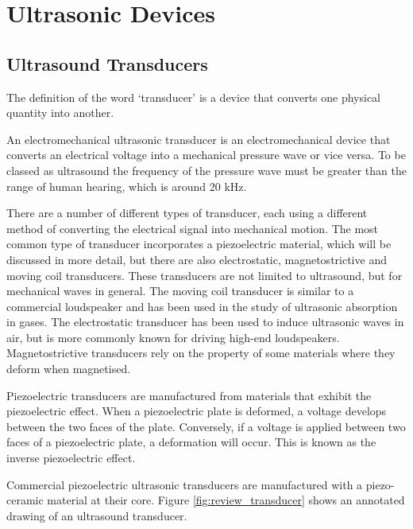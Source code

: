 \section{Ultrasonic Devices}

\subsection{Ultrasound Transducers}

The definition of the word `transducer' is a device that converts one physical quantity into another\cite{transducer_concise_2006}.

An electromechanical ultrasonic transducer is an electromechanical device that converts an electrical voltage into a mechanical pressure wave or vice versa. To be classed as ultrasound the frequency of the pressure wave must be greater than the range of human hearing, which is around 20 kHz\cite{rosen_signals_2010}.

There are a number of different types of transducer, each using a different method of converting the electrical signal into mechanical motion. The most common type of transducer incorporates a piezoelectric material, which will be discussed in more detail, but there are also electrostatic, magnetostrictive and moving coil transducers. These transducers are not limited to ultrasound, but for mechanical waves in general. The moving coil transducer is similar to a commercial loudspeaker and has been used in the study of ultrasonic absorption in gases\cite{st_clair_electromagnetic_1941}. The electrostatic transducer has been used to induce ultrasonic waves in air\cite{wright_studies_1994}, but is more commonly known for driving high-end loudspeakers\cite{heydt_acoustical_2000}. Magnetostrictive transducers rely on the property of some materials where they deform when magnetised\cite{ryu_magnetoelectric_2001}.

Piezoelectric transducers are manufactured from materials that exhibit the piezoelectric effect. When a piezoelectric plate is deformed, a voltage develops between the two faces of the plate. Conversely, if a voltage is applied between two faces of a piezoelectric plate, a deformation will occur. This is known as the inverse piezoelectric effect\cite{gooberman_ultrasonics:_1969,vives_piezoelectric_2013}.

Commercial piezoelectric ultrasonic transducers are manufactured with a piezo-ceramic material at their core. Figure \ref{fig:review_transducer} shows an annotated drawing of an ultrasound transducer.


